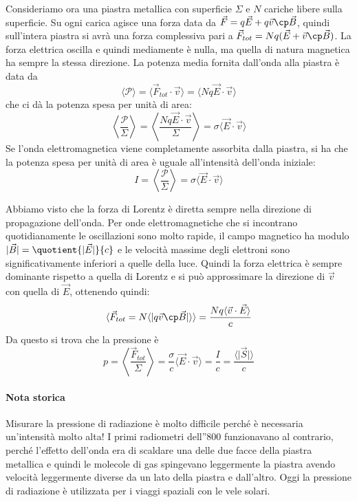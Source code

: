 Consideriamo ora una piastra metallica con superficie \(\Sigma \) e \(N\) cariche libere sulla superficie. Su ogni carica agisce una forza data da \(\vec{F}=q \vec{E} + q \vec{v} \cp \vec{B}\), quindi sull'intera piastra si avrà una forza complessiva pari a \(\vec{F}_{tot} = Nq (\vec{E}+ \vec{v} \cp \vec{B})\). La forza elettrica oscilla e quindi mediamente è nulla, ma quella di natura magnetica ha sempre la stessa direzione. La potenza media fornita dall'onda alla piastra è data da
\begin{equation}
	\langle \mathcal{P} \rangle = \langle \vec{F}_{tot} \cdot \vec{v} \rangle = \langle N q \vec{E} \cdot \vec{v} \rangle 
\end{equation}
che ci dà la potenza spesa per unità di area:
\begin{equation}
	\left\langle \frac{\mathcal{P} }{\Sigma } \right\rangle =
	\left\langle \frac{Nq \vec{E}\cdot \vec{v}}{\Sigma } \right\rangle 
	= \sigma \langle \vec{E}\cdot \vec{v} \rangle 
\end{equation}
Se l'onda elettromagnetica viene completamente assorbita dalla piastra, si ha che la potenza spesa per unità di area è uguale all'intensità dell'onda iniziale:
\begin{equation}
	I = \left\langle \frac{\mathcal{P} }{\Sigma } \right\rangle 
	= \sigma \langle \vec{E}\cdot \vec{v} \rangle 
\end{equation}

Abbiamo visto che la forza di Lorentz è diretta sempre nella direzione di propagazione dell'onda. Per onde elettromagnetiche che si incontrano quotidianamente le oscillazioni sono molto rapide, il campo magnetico ha modulo \(\vert \vec{B} \vert = \quotient{\vert \vec{E} \vert }{c}  \) e le velocità massime degli elettroni sono significativamente inferiori a quelle della luce. Quindi la forza elettrica è sempre dominante rispetto a quella di Lorentz e si può approssimare la direzione di \(\vec{v}\) con quella di \(\vec{E}\), ottenendo quindi:
\begin{equation}
	\langle \vec{F}_{tot} = N \langle \vert q\vec{v} \cp \vec{B} \vert  \rangle  \rangle 
	= \frac{Nq \langle \vec{v} \cdot \vec{E}  \rangle }{c}
\end{equation}
Da questo si trova che la pressione è
\begin{equation}
	p = \left\langle \frac{\vec{F}_{tot} }{\Sigma } \right\rangle =
	\frac{\sigma }{c} \langle \vec{E} \cdot \vec{v} \rangle =
	\frac{I}{c}=
	\frac{\langle \vert \vec{S} \vert  \rangle }{c}
\end{equation}

\paragraph{Nota storica} Misurare la pressione di radiazione è molto difficile perché è necessaria un'intensità molto alta! I primi radiometri dell''800 funzionavano al contrario, perché l'effetto dell'onda era di scaldare una delle due facce della piastra metallica e quindi le molecole di gas spingevano leggermente la piastra avendo velocità leggermente diverse da un lato della piastra e dall'altro. Oggi la pressione di radiazione è utilizzata per i viaggi spaziali con le vele solari.